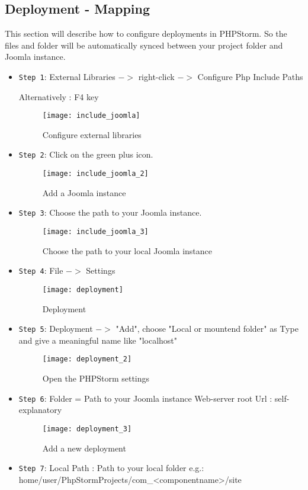 \subsection{Deployment - Mapping}
This section will describe how to configure deployments in PHPStorm. So the files and folder will be automatically synced between your project folder and Joomla instance.
\begin{itemize}
	\item \texttt{Step 1}: External Libraries $->$ right-click  $->$ Configure Php Include Paths
	
	Alternatively : F4 key
	\begin{figure}[H] 
		\centering
		\texttt{[image: include\_joomla]}
		\caption{Configure external libraries}
	\end{figure}
	\item \texttt{Step 2}: Click on the green plus icon.
	\begin{figure}[H] 
		\centering
		\vspace{3pt}
		\texttt{[image: include\_joomla\_2]}
		\caption{Add a Joomla instance}
	\end{figure}
	\item \texttt{Step 3}: Choose the path to your Joomla instance.
	\begin{figure}[H] 
		\centering
		\vspace{3pt}
		\texttt{[image: include\_joomla\_3]}
		\caption{Choose the path to your local Joomla instance}
	\end{figure}
	\item \texttt{Step 4}: File $->$ Settings
	\begin{figure}[H] 
		\centering
		\vspace{3pt}
		\texttt{[image: deployment]}
		\caption{Deployment}
	\end{figure}
	\item \texttt{Step 5}: Deployment $->$ "Add", choose "Local or mountend folder" as Type and give a meaningful name like "localhost"
	\begin{figure}[H] 
		\centering
		\vspace{3pt}
		\texttt{[image: deployment\_2]}
		\caption{Open the PHPStorm settings}
	\end{figure}
	\item \texttt{Step 6}: Folder = Path to your Joomla instance
						   Web-server root Url : self-explanatory
	
	\begin{figure}[H] 
		\centering
		\vspace{3pt}
		\texttt{[image: deployment\_3]}
		\caption{Add a new deployment}
	\end{figure}
	\item \texttt{Step 7}: Local Path : Path to your local folder
	e.g.: home/user/PhpStormProjects/com\_<componentname>/site
	

\end{itemize}

